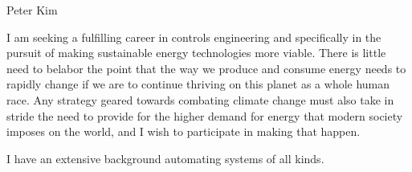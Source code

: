 \documentclass[11pt]{article}
\begin{document}
{\Huge Peter Kim}

I am seeking a fulfilling career in controls engineering and specifically
in the pursuit of making sustainable energy technologies more viable. There
is little need to belabor the point that the way we produce and consume
energy needs to rapidly change if we are to continue thriving on this 
planet as a whole human race. Any strategy geared towards combating climate
change must also take in stride the need to provide for the higher demand
for energy that modern society imposes on the world, and I wish to 
participate in making that happen.

I have an extensive background automating systems of all kinds. 
\end{document}
